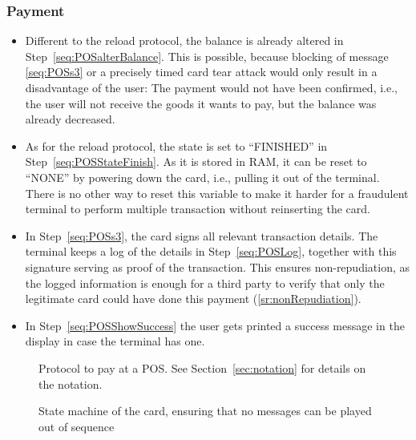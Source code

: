 \documentclass{article}
\begin{document}
\subsubsection*{Payment}
\begin{itemize}

    \item Different to the reload protocol, the balance is already altered in Step~\ref{seq:POSalterBalance}.
    This is possible, because blocking of message \ref{seq:POSs3} or a precisely timed card tear attack would only result in a disadvantage of the user:
    The payment would not have been confirmed, i.e., the user will not receive the goods it wants to pay, but the balance was already decreased.

    \item As for the reload protocol, the state is set to ``FINISHED'' in Step~\ref{seq:POSStateFinish}.
    As it is stored in RAM, it can be reset to ``NONE'' by powering down the card, i.e., pulling it out of the terminal.
    There is no other way to reset this variable to make it harder for a fraudulent terminal to perform multiple transaction without reinserting the card.


    \item In Step~\ref{seq:POSs3}, the card signs all relevant transaction details.
    The terminal keeps a log of the details in Step~\ref{seq:POSLog}, together with this signature serving as proof of the transaction.
    This ensures non-repudiation, as the logged information is enough for a third party to verify that only the legitimate card could have done this payment (\ref{sr:nonRepudiation}).

    \item In Step~\ref{seq:POSShowSuccess} the user gets printed a success message in the display in case the terminal has one.
\end{itemize}

\begin{figure}
    \centering
    
    \caption{Protocol to pay at a POS.
    See Section~\ref{sec:notation} for details on the notation.
    }
    \label{fig:ReloadProtocol}
\end{figure}


\begin{figure}
    \centering
    
    \caption{State machine of the card, ensuring that no messages can be played out of sequence}
    \label{fig:stateMachine}
\end{figure}
\end{document}
